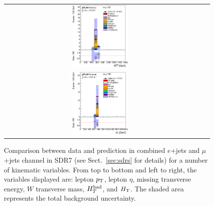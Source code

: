 \begin{figure}[h!]
\begin{center}
\begin{tabular}{ccc}
\includegraphics[width=0.30\textwidth]{appendices/figures/sdrs/HTHad_ELEMUONCR7_1W_NOMINAL.eps}  \\
\includegraphics[width=0.30\textwidth]{appendices/figures/sdrs/HTAll_ELEMUONCR7_1W_NOMINAL.eps}  &  &\\
\end{tabular}\caption{\small {Comparison between data and prediction in combined $e$+jets and $\mu$+jets channel in SDR7 (see Sect.~\ref{sec:sdrs} for details) 
for a number of kinematic variables. From top to bottom and left to right, the variables displayed are: lepton $\pt$, lepton $\eta$, missing transverse energy, $W$ transverse mass,
$\hthad$, and $\HT$. The shaded area represents the total background uncertainty.}}
\label{fig:ELEMUONCR7_1}
\end{center}
\end{figure}                                                                             

